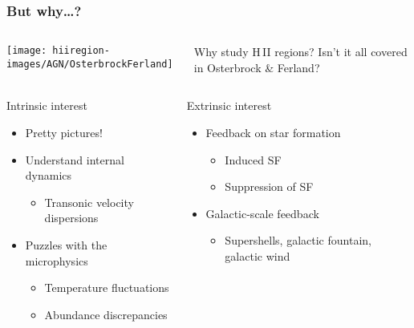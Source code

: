 \documentclass{beamer}
\begin{document}
\begin{frame}
  \frametitle{But why\dots ?}
  \begin{columns}
    \texttt{[image: hiiregion-images/AGN/OsterbrockFerland]}
    \begin{alertblock}{Why study H\,II regions?}
      Isn't it all covered in Osterbrock \& Ferland?
    \end{alertblock}
  \end{columns}
  \begin{columns}
    \begin{block}{Intrinsic interest}
      \begin{itemize}
      \item \alert<2>{Pretty pictures!}
      \item Understand internal dynamics
        \begin{itemize}
        \item Transonic velocity dispersions
        \end{itemize}
      \item Puzzles with the microphysics
        \begin{itemize}
        \item Temperature fluctuations
        \item Abundance discrepancies
        \end{itemize}
      \end{itemize}
    \end{block}
    \begin{block}{Extrinsic interest}
      \begin{itemize}
      \item Feedback on star formation
        \begin{itemize}
        \item Induced SF
        \item Suppression of SF
        \end{itemize}
      \item Galactic-scale feedback
        \begin{itemize}
        \item Supershells, galactic fountain, galactic wind
        \end{itemize}
      \end{itemize}
    \end{block}
  \end{columns}
\end{frame}
\end{document}
